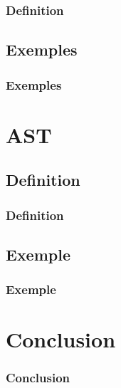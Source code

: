 \documentclass[hyperref={bookmarks=false},aspectratio=169]{beamer}
\begin{document}

\begin{frame}
\frametitle{Definition}


\end{frame}

\subsection{Exemples}



\begin{frame}
\frametitle{Exemples}


\end{frame}


\section{AST}


\subsection{Definition}



\begin{frame}
\frametitle{Definition}


\end{frame}

\subsection{Exemple}



\begin{frame}
\frametitle{Exemple}


\end{frame}

\section{Conclusion}


\begin{frame}
\frametitle{Conclusion}


\end{frame}
\end{document}
